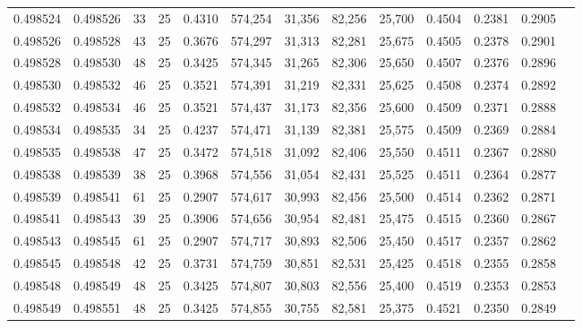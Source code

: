 \begin{tabular}{rrrrrrrrrrrrr}
0.498524 & 0.498526 &    33 &  25 &                                     0.4310 & 574,254 &  31,356 &  82,256 &  25,700 & 0.4504 & 0.2381 & 0.2905 \\
0.498526 & 0.498528 &    43 &  25 &                                     0.3676 & 574,297 &  31,313 &  82,281 &  25,675 & 0.4505 & 0.2378 & 0.2901 \\
0.498528 & 0.498530 &    48 &  25 &                                     0.3425 & 574,345 &  31,265 &  82,306 &  25,650 & 0.4507 & 0.2376 & 0.2896 \\
0.498530 & 0.498532 &    46 &  25 &                                     0.3521 & 574,391 &  31,219 &  82,331 &  25,625 & 0.4508 & 0.2374 & 0.2892 \\
0.498532 & 0.498534 &    46 &  25 &                                     0.3521 & 574,437 &  31,173 &  82,356 &  25,600 & 0.4509 & 0.2371 & 0.2888 \\
0.498534 & 0.498535 &    34 &  25 &                                     0.4237 & 574,471 &  31,139 &  82,381 &  25,575 & 0.4509 & 0.2369 & 0.2884 \\
0.498535 & 0.498538 &    47 &  25 &                                     0.3472 & 574,518 &  31,092 &  82,406 &  25,550 & 0.4511 & 0.2367 & 0.2880 \\
0.498538 & 0.498539 &    38 &  25 &                                     0.3968 & 574,556 &  31,054 &  82,431 &  25,525 & 0.4511 & 0.2364 & 0.2877 \\
0.498539 & 0.498541 &    61 &  25 &                                     0.2907 & 574,617 &  30,993 &  82,456 &  25,500 & 0.4514 & 0.2362 & 0.2871 \\
0.498541 & 0.498543 &    39 &  25 &                                     0.3906 & 574,656 &  30,954 &  82,481 &  25,475 & 0.4515 & 0.2360 & 0.2867 \\
0.498543 & 0.498545 &    61 &  25 &                                     0.2907 & 574,717 &  30,893 &  82,506 &  25,450 & 0.4517 & 0.2357 & 0.2862 \\
0.498545 & 0.498548 &    42 &  25 &                                     0.3731 & 574,759 &  30,851 &  82,531 &  25,425 & 0.4518 & 0.2355 & 0.2858 \\
0.498548 & 0.498549 &    48 &  25 &                                     0.3425 & 574,807 &  30,803 &  82,556 &  25,400 & 0.4519 & 0.2353 & 0.2853 \\
0.498549 & 0.498551 &    48 &  25 &                                     0.3425 & 574,855 &  30,755 &  82,581 &  25,375 & 0.4521 & 0.2350 & 0.2849 \\

\end{tabular}
